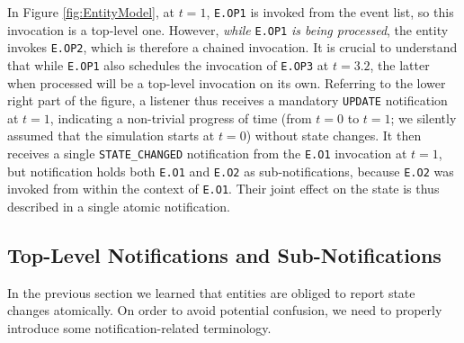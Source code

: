 In Figure \ref{fig:EntityModel},
  at $t=1$,
  \lstinline|E.OP1| is invoked from the event list,
  so this invocation is a top-level one.
However,
  {\em while\/} \lstinline|E.OP1| {\em is being processed},
  the entity invokes \lstinline|E.OP2|,
  which is therefore a chained invocation.
It is crucial to understand that
  while \lstinline|E.OP1| also
  schedules the invocation of \lstinline|E.OP3|
  at $t=3.2$,
  the latter when processed will be a top-level invocation
  on its own.
Referring to the lower right part of the figure,
  a listener thus receives a mandatory \lstinline|UPDATE|
  notification at $t=1$,
  indicating a non-trivial progress of time
  (from $t=0$ to $t=1$; we silently assumed that
   the simulation starts at $t=0$)
  without state changes.
It then receives a single \lstinline|STATE_CHANGED|
  notification from the \lstinline|E.O1|
  invocation at $t=1$,
  but notification holds both
  \lstinline|E.O1| and \lstinline|E.O2|
  as sub-notifications,
  because \lstinline|E.O2|
  was invoked from within the
  context of \lstinline|E.O1|.
Their joint effect on the state
  is thus described in a single atomic notification.

\subsection{Top-Level Notifications and Sub-Notifications}
\label{sec:entities:notifications}

In the previous section
  we learned that entities are obliged to report
  state changes atomically.
On order to avoid potential confusion,
  we need to properly introduce
  some notification-related terminology.
  
